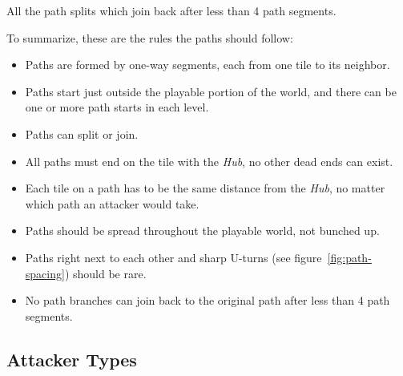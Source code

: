 \begin{center}
    \captionsetup{type=figure}
    \caption{All the path splits which join back after less than 4 path segments.}
    \label{fig:too-short-path-splits}
\end{center}

To summarize, these are the rules the paths should follow:
\begin{itemize}
    \item Paths are formed by one-way segments, each from one tile to its neighbor.
    \item Paths start just outside the playable portion of the world, and there can be one or more path starts in each level.
    \item Paths can split or join.
    \item All paths must end on the tile with the \emph{Hub}, no other dead ends can exist.
    \item Each tile on a path has to be the same distance from the \emph{Hub}, no matter which path an attacker would take.
    \item Paths should be spread throughout the playable world, not bunched up.
    \item Paths right next to each other and sharp U-turns (see figure~\ref{fig:path-spacing}) should be rare.
    \item No path branches can join back to the original path after less than 4 path segments.
\end{itemize}

\subsection{Attacker Types}\label{sec:attacker-types}

